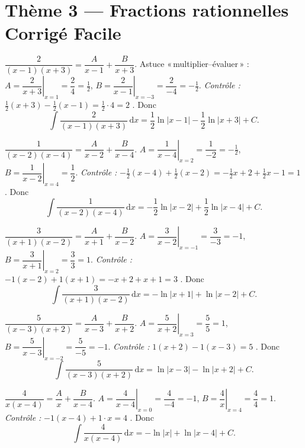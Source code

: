 \documentclass[11pt,a4paper]{article}
\newcommand{\dd}{\mathrm{d}}
\begin{document}
\section*{Thème 3 — Fractions rationnelles \quad\textbullet\quad Corrigé Facile}

\begin{corr}[1]
$\dfrac{2}{(x-1)(x+3)}=\dfrac{A}{x-1}+\dfrac{B}{x+3}$. Astuce «\,multiplier–évaluer\,» :
$A=\left.\dfrac{2}{x+3}\right|_{x=1}=\dfrac24=\tfrac12$,
$B=\left.\dfrac{2}{x-1}\right|_{x=-3}=\dfrac{2}{-4}=-\tfrac12$.
\emph{Contrôle :} $\tfrac12(x+3)-\tfrac12(x-1)=\tfrac12\cdot4=2$ \checkmark. Donc
\[
\int \frac{2}{(x-1)(x+3)}\,\dd x
=\frac12\ln|x-1|-\frac12\ln|x+3|+C.
\]
\end{corr}

\begin{corr}[2]
$\dfrac{1}{(x-2)(x-4)}=\dfrac{A}{x-2}+\dfrac{B}{x-4}$.
$A=\left.\dfrac{1}{x-4}\right|_{x=2}=\dfrac{1}{-2}=-\tfrac12$,
$B=\left.\dfrac{1}{x-2}\right|_{x=4}=\dfrac12$.
\emph{Contrôle :} $-\tfrac12(x-4)+\tfrac12(x-2)=-\tfrac12x+2+\tfrac12x-1=1$ \checkmark. Donc
\[
\int \frac{1}{(x-2)(x-4)}\,\dd x
=-\frac12\ln|x-2|+\frac12\ln|x-4|+C.
\]
\end{corr}

\begin{corr}[3]
$\dfrac{3}{(x+1)(x-2)}=\dfrac{A}{x+1}+\dfrac{B}{x-2}$.
$A=\left.\dfrac{3}{x-2}\right|_{x=-1}=\dfrac{3}{-3}=-1$,
$B=\left.\dfrac{3}{x+1}\right|_{x=2}=\dfrac{3}{3}=1$.
\emph{Contrôle :} $-1(x-2)+1(x+1)=-x+2+x+1=3$ \checkmark. Donc
\[
\int \frac{3}{(x+1)(x-2)}\,\dd x
=-\ln|x+1|+\ln|x-2|+C.
\]
\end{corr}

\begin{corr}[4]
$\dfrac{5}{(x-3)(x+2)}=\dfrac{A}{x-3}+\dfrac{B}{x+2}$.
$A=\left.\dfrac{5}{x+2}\right|_{x=3}=\dfrac{5}{5}=1$,
$B=\left.\dfrac{5}{x-3}\right|_{x=-2}=\dfrac{5}{-5}=-1$.
\emph{Contrôle :} $1(x+2)-1(x-3)=5$ \checkmark. Donc
\[
\int \frac{5}{(x-3)(x+2)}\,\dd x
=\ln|x-3|-\ln|x+2|+C.
\]
\end{corr}

\begin{corr}[5]
$\dfrac{4}{x(x-4)}=\dfrac{A}{x}+\dfrac{B}{x-4}$.
$A=\left.\dfrac{4}{x-4}\right|_{x=0}=\dfrac{4}{-4}=-1$,
$B=\left.\dfrac{4}{x}\right|_{x=4}=\dfrac{4}{4}=1$.
\emph{Contrôle :} $-1(x-4)+1\cdot x=4$ \checkmark. Donc
\[
\int \frac{4}{x(x-4)}\,\dd x
=-\ln|x|+\ln|x-4|+C.
\]
\end{corr}
\end{document}
